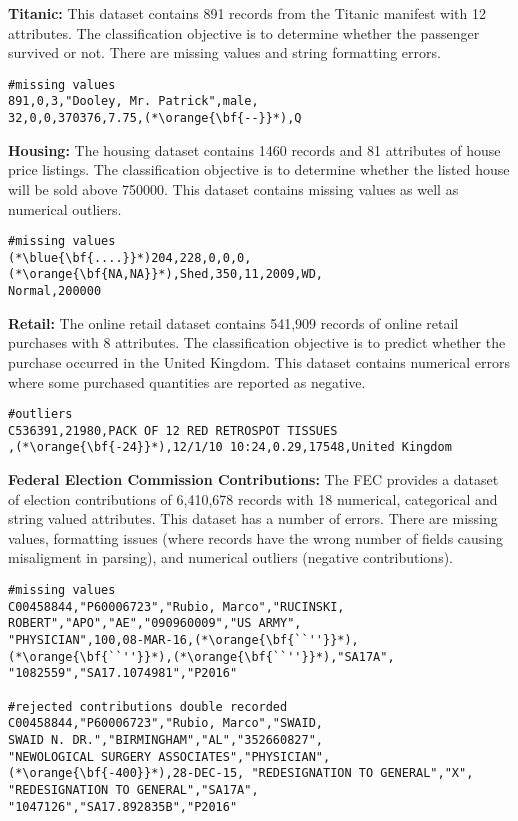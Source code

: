 \vspace{0.5em}\noindent\textbf{Titanic: } This dataset contains 891 records from the Titanic manifest with 12 attributes. The classification objective is to determine whether the passenger survived or not. There are missing values and string formatting errors.

\begin{lstlisting}
#missing values
891,0,3,"Dooley, Mr. Patrick",male,
32,0,0,370376,7.75,(*\orange{\bf{--}}*),Q
\end{lstlisting}

\vspace{0.5em}\noindent\textbf{Housing: } The housing dataset contains 1460 records and 81 attributes of house price listings. The classification objective is to determine whether the listed house will be sold above 750000. 
This dataset contains missing values as well as numerical outliers.
\begin{lstlisting}
#missing values
(*\blue{\bf{....}}*)204,228,0,0,0,(*\orange{\bf{NA,NA}}*),Shed,350,11,2009,WD,
Normal,200000
\end{lstlisting}

\vspace{0.5em}\noindent\textbf{Retail: } The online retail dataset contains 541,909 records of online retail purchases with 8 attributes. The classification objective is to predict whether the purchase occurred in the United Kingdom.
This dataset contains numerical errors where some purchased quantities are reported as negative.

\begin{lstlisting}
#outliers
C536391,21980,PACK OF 12 RED RETROSPOT TISSUES
,(*\orange{\bf{-24}}*),12/1/10 10:24,0.29,17548,United Kingdom
\end{lstlisting}

\vspace{0.5em}\noindent\textbf{Federal Election Commission Contributions: } The FEC provides a dataset of election contributions of 6,410,678 records with 18 numerical, categorical and string valued attributes. This dataset has a number of errors. There are missing values, formatting issues (where records have the wrong number of fields causing misaligment in parsing), and numerical outliers (negative contributions).

\begin{lstlisting}
#missing values
C00458844,"P60006723","Rubio, Marco","RUCINSKI,
ROBERT","APO","AE","090960009","US ARMY",
"PHYSICIAN",100,08-MAR-16,(*\orange{\bf{``''}}*),(*\orange{\bf{``''}}*),(*\orange{\bf{``''}}*),"SA17A",
"1082559","SA17.1074981","P2016"

#rejected contributions double recorded
C00458844,"P60006723","Rubio, Marco","SWAID, 
SWAID N. DR.","BIRMINGHAM","AL","352660827",
"NEWOLOGICAL SURGERY ASSOCIATES","PHYSICIAN",
(*\orange{\bf{-400}}*),28-DEC-15, "REDESIGNATION TO GENERAL","X",
"REDESIGNATION TO GENERAL","SA17A",
"1047126","SA17.892835B","P2016"
\end{lstlisting}

